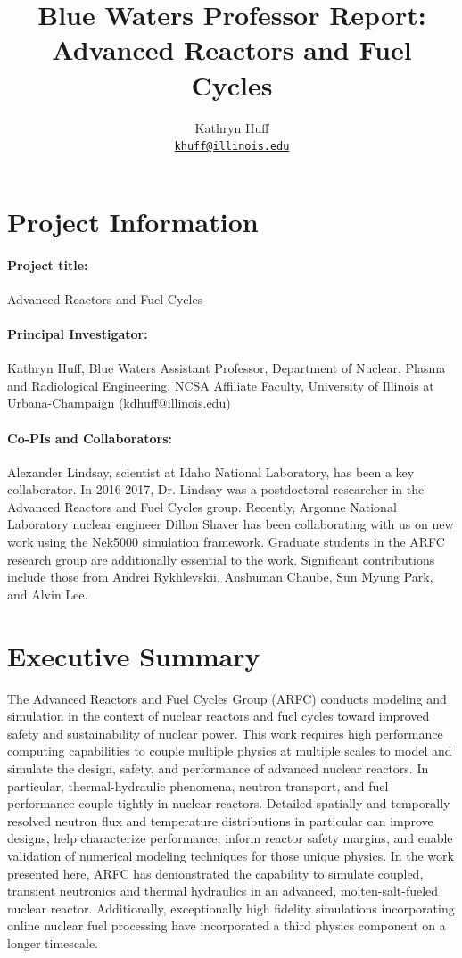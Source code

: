 \documentclass[letterpaper]{article}
\author{Kathryn Huff
\\ \href{mailto:kdhuff@illinois.edu}{\texttt{khuff@illinois.edu}}
}
\date{}
\title{Blue Waters Professor Report:\\
Advanced Reactors and Fuel Cycles}
\begin{document}
\maketitle

\section{Project Information}

\paragraph{Project title:} Advanced Reactors and Fuel Cycles

\paragraph{Principal Investigator:} Kathryn Huff, Blue Waters Assistant Professor, Department of Nuclear, Plasma and Radiological Engineering, NCSA Affiliate Faculty, University of Illinois at Urbana-Champaign (kdhuff@illinois.edu)

\paragraph{Co-PIs and Collaborators:} Alexander Lindsay, scientist at Idaho 
National Laboratory, has been a key collaborator. In 2016-2017, Dr. Lindsay was 
a postdoctoral researcher in the Advanced Reactors and Fuel Cycles group. 
Recently, Argonne National Laboratory nuclear engineer Dillon Shaver has been 
collaborating with us on new work using the Nek5000 simulation framework.
Graduate students in the ARFC research group are additionally essential to the 
work. Significant contributions include those from Andrei Rykhlevskii, Anshuman 
Chaube, Sun Myung Park, and Alvin Lee.

\section{Executive Summary}
The Advanced Reactors and Fuel Cycles Group (ARFC) conducts modeling and 
simulation in the context of nuclear reactors and fuel cycles toward improved 
safety and sustainability of nuclear power.  This work requires high 
performance computing capabilities to couple multiple physics at multiple
scales to model and simulate the design, safety, and performance of advanced
nuclear reactors. In particular, thermal-hydraulic phenomena, neutron
transport, and fuel performance couple tightly in nuclear reactors. Detailed
spatially and temporally resolved neutron flux and temperature distributions in
particular can improve designs, help characterize performance, inform reactor
safety margins, and enable validation of numerical modeling techniques for
those unique physics. In the work presented here, ARFC has demonstrated the
capability to simulate coupled, transient neutronics and thermal hydraulics in
an advanced, molten-salt-fueled nuclear reactor. Additionally, exceptionally
high fidelity simulations incorporating online nuclear fuel processing have
incorporated a third physics component on a longer timescale.
\end{document}
